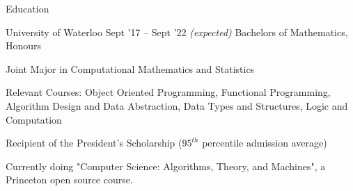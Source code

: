 \documentclass{resume} %
\begin{document}

\begin{rSection}{Education}
  \begin{rSubsection}{University of Waterloo}
		     {Sept '17 -- Sept '22 \em (expected)}
		     {Bachelors of Mathematics, Honours}
		     {}
	\item Joint Major in Computational Mathematics and Statistics
	\item Relevant Courses: Object Oriented Programming, Functional Programming, Algorithm Design and Data Abstraction, Data Types and Structures, Logic and Computation
    \item  Recipient of the President's Scholarship
      ($95^{th}$ percentile admission average)
  \end{rSubsection}
  \begin{rMinisection}
  	\item Currently doing "Computer Science: Algorithms, Theory, and Machines", a Princeton open source course.
  \end{rMinisection}
\end{rSection} 
\end{document}
